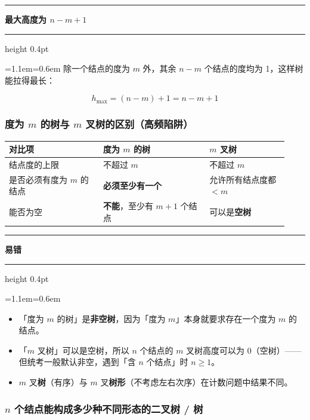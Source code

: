\documentclass[11pt,openany,UTF8]{ctexbook}
\newcommand{\callouthead}[2]{%
  \par\addvspace{7pt}\noindent
  {\color{#1}\rule[-0.15em]{3pt}{1.05em}}\hspace{0.5em}%
  {\bfseries\color{#1}#2}\par\nobreak\vspace{-0.35em}%
  {\color{rulesep}\hrule height 0.4pt}\nobreak\vspace{0.45em}%
  \begingroup\small\setlength{\parindent}{0pt}%
  \leftskip=1.1em\rightskip=0.6em\noindent\ignorespaces}
\newcommand{\calloutend}{\par\endgroup\addvspace{7pt}}
\newenvironment{callkey}[1]{\callouthead{keybar}{#1}}{\calloutend}
\newenvironment{callwarn}[1]{\callouthead{warnbar}{#1}}{\calloutend}
\begin{document}
\begin{callkey}{最大高度为 $n-m+1$}
除一个结点的度为 $m$ 外，其余 $n-m$ 个结点的度均为 1，这样树能拉得最长：

\[h_{\max}=(n-m)+1=n-m+1\]

\end{callkey}

\subsubsection{度为 $m$ 的树与 $m$ 叉树的区别（高频陷阱）}

\begingroup\small\setlength{\tabcolsep}{4.0pt}
\begin{longtable}{@{}L{0.3137\linewidth}L{0.3513\linewidth}L{0.2635\linewidth}@{}}
\toprule
\textbf{对比项} & \textbf{度为 $m$ 的树} & \textbf{$m$ 叉树} \\
\midrule
\endhead
结点度的上限 & 不超过 $m$ & 不超过 $m$ \\
是否必须有度为 $m$ 的结点 & \textbf{必须至少有一个} & 允许所有结点度都 $<m$ \\
能否为空 & \textbf{不能}，至少有 $m+1$ 个结点 & 可以是\textbf{空树} \\
\bottomrule
\end{longtable}
\endgroup

\begin{callwarn}{易错}
\begin{itemize}
\item 「度为 $m$ 的树」是\textbf{非空树}，因为「度为 $m$」本身就要求存在一个度为 $m$ 的结点。
\item 「$m$ 叉树」可以是空树，所以 $n$ 个结点的 $m$ 叉树高度可以为 0（空树）——但统考一般默认非空，遇到「含 $n$ 个结点」时 $n\ge1$。
\item $m$ 叉\textbf{树}（有序）与 $m$ 叉\textbf{树形}（不考虑左右次序）在计数问题中结果不同。
\end{itemize}
\end{callwarn}

\subsubsection{$n$ 个结点能构成多少种不同形态的二叉树 / 树}
\end{document}
